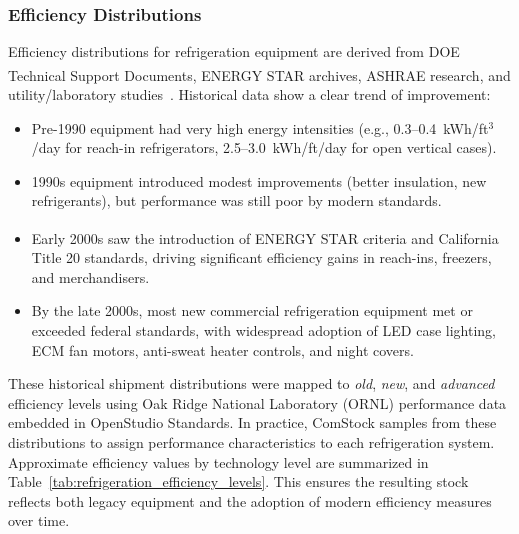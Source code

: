 \subsubsection{Efficiency Distributions}
Efficiency distributions for refrigeration equipment are derived from DOE Technical Support Documents, ENERGY STAR\textsuperscript{\textregistered} archives, ASHRAE research, and utility/laboratory studies~\citep{DOE_TSD_2009,Fricke2010,CEC_Title20}. Historical data show a clear trend of improvement:
\begin{itemize}
    \item Pre-1990 equipment had very high energy intensities (e.g., 0.3--0.4~kWh/ft$^3$/day for reach-in refrigerators, 2.5--3.0~kWh/ft/day for open vertical cases).
    \item 1990s equipment introduced modest improvements (better insulation, new refrigerants), but performance was still poor by modern standards.
    \item Early 2000s saw the introduction of ENERGY STAR\textsuperscript{\textregistered} criteria and California Title 20 standards, driving significant efficiency gains in reach-ins, freezers, and merchandisers.
    \item By the late 2000s, most new commercial refrigeration equipment met or exceeded federal standards, with widespread adoption of LED case lighting, ECM fan motors, anti-sweat heater controls, and night covers.
\end{itemize}

These historical shipment distributions were mapped to \textit{old}, \textit{new}, and \textit{advanced} efficiency levels using Oak Ridge National Laboratory (ORNL) performance data embedded in OpenStudio Standards. In practice, ComStock samples from these distributions to assign performance characteristics to each refrigeration system. Approximate efficiency values by technology level are summarized in Table~\ref{tab:refrigeration_efficiency_levels}. This ensures the resulting stock reflects both legacy equipment and the adoption of modern efficiency measures over time.


